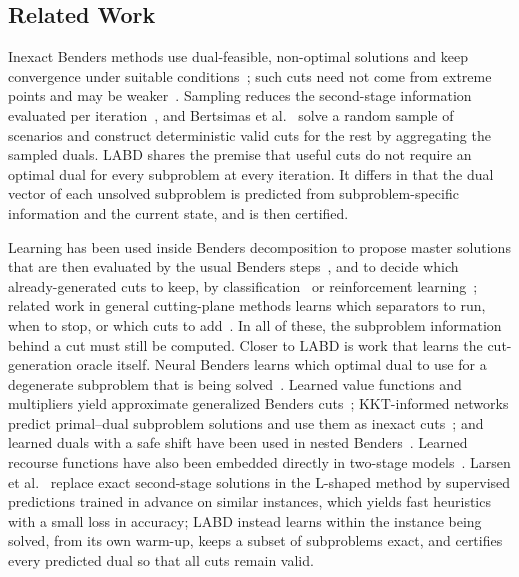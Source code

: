 \subsection{Related Work}\label{subsec:related}

Inexact Benders methods use dual-feasible, non-optimal solutions and keep convergence under suitable conditions~\cite{zakeri2000inexact}; such cuts need not come from extreme points and may be weaker~\cite{yang2012tighter}. Sampling reduces the second-stage information evaluated per iteration~\cite{infanger1992monte}, and Bertsimas et al.~\cite{bertsimas2024stochastic} solve a random sample of scenarios and construct deterministic valid cuts for the rest by aggregating the sampled duals. LABD shares the premise that useful cuts do not require an optimal dual for every subproblem at every iteration. It differs in that the dual vector of each unsolved subproblem is predicted from subproblem-specific information and the current state, and is then certified.

Learning has been used inside Benders decomposition to propose master solutions that are then evaluated by the usual Benders steps~\cite{mana2024accelerating,agyeman2026graph}, and to decide which already-generated cuts to keep, by classification~\cite{jia2021benders} or reinforcement learning~\cite{cai2026rlbd}; related work in general cutting-plane methods learns which separators to run, when to stop, or which cuts to add~\cite{li2023separators,ling2024stop,huang2022learning,paulus2022learning}. In all of these, the subproblem information behind a cut must still be computed. Closer to LABD is work that learns the cut-generation oracle itself. Neural Benders learns which optimal dual to use for a degenerate subproblem that is being solved~\cite{monemi2025neuralbenders}. Learned value functions and multipliers yield approximate generalized Benders cuts~\cite{mitrai2024mlbenders}; KKT-informed networks predict primal--dual subproblem solutions and use them as inexact cuts~\cite{agyeman2026hybrid}; and learned duals with a safe shift have been used in nested Benders~\cite{aslani2025lcc}. Learned recourse functions have also been embedded directly in two-stage models~\cite{patel2022neur2sp}.  Larsen et al.~\cite{larsen2024fast} replace exact second-stage solutions in the L-shaped method by supervised predictions trained in advance on similar instances, which yields fast heuristics with a small loss in accuracy; LABD instead learns within the instance being solved, from its own warm-up, keeps a subset of subproblems exact, and certifies every predicted dual so that all cuts remain valid.

